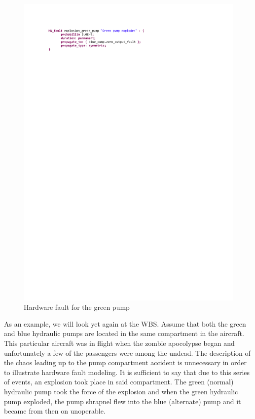 \begin{figure}[h!]
	\hspace*{-2cm}
	\vspace{-0.3in} 
	\begin{center}
		\includegraphics[trim=0 690 -10 70,clip,width=1.5\dimexpr\textwidth-2cm\relax]{images/hw_fault_green_pump.pdf}
		\caption{Hardware fault for the green pump}
		\label{fig:hwFault}
	\end{center}
	\vspace{-0.3in}
\end{figure}

As an example, we will look yet again at the WBS. Assume that both the green and blue hydraulic pumps are located in the same compartment in the aircraft. This particular aircraft was in flight when the zombie apocolypse began and unfortunately a few of the passengers were among the undead. The description of the chaos leading up to the pump compartment accident is unnecessary in order to illustrate hardware fault modeling. It is sufficient to say that due to this series of events, an explosion took place in said compartment. The green (normal) hydraulic pump took the force of the explosion and when the green hydraulic pump exploded, the pump shrapnel flew into the blue (alternate) pump and it became from then on unoperable. 

